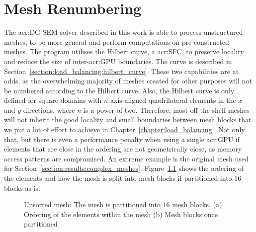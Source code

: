 \chapter{Mesh Renumbering}\label{chapter:renumbering}

The \acrshort{acr:DG-SEM} solver described in this work is able to process unstructured meshes, to
be more general and perform computations on pre-constructed meshes. The program utilises the Hilbert
curve, a \acrlong{acr:SFC}, to preserve locality and reduce the size of inter-\acrshort{acr:GPU}
boundaries. The curve is described in Section~\ref{section:load_balancing:hilbert_curve}. These two
capabilities are at odds, as the overwhelming majority of meshes created for other purposes will not
be numbered according to the Hilbert curve. Also, the Hilbert curve is only defined for square
domains with \(n\) axis-aligned quadrilateral elements in the \(x\) and \(y\) directions, where
\(n\) is a power of two. Therefore, most off-the-shelf meshes will not inherit the good locality and
small boundaries between mesh blocks that we put a lot of effort to achieve in
Chapter~\ref{chapter:load_balancing}. Not only that, but there is even a performance penalty when
using a single \acrshort{acr:GPU} if elements that are close in the ordering are not geometrically
close, as memory access patterns are compromised. An extreme example is the original mesh used for
Section~\ref{section:results:complex_meshes}. Figure~\ref{fig:mesh_unsorted} shows the ordering of
the elements and how the mesh is split into mesh blocks if partitioned into \(16\) blocks as-is. 

\begin{figure}[H]
	\centering
	\caption{Unsorted mesh: The mesh is partitioned into \(16\) mesh blocks. (a) Ordering of the elements within the mesh (b) Mesh blocks once partitioned}\label{fig:mesh_unsorted}
\end{figure}

